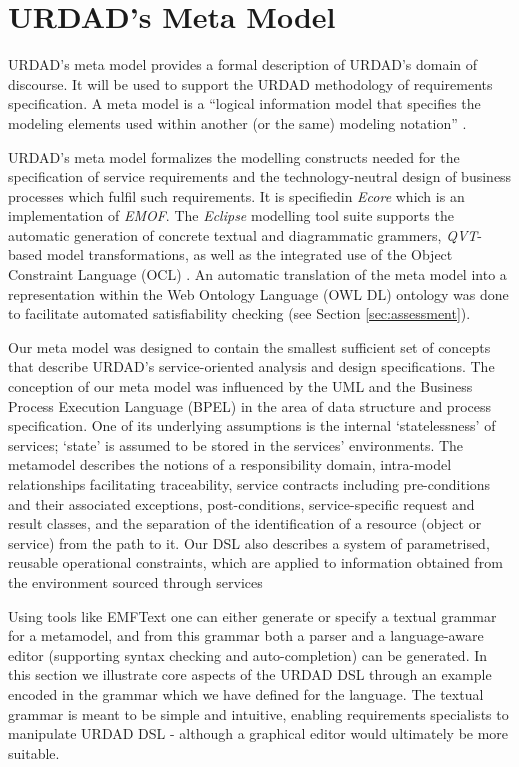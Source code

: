 \section{URDAD's Meta Model \label{sec:metamodel}}

URDAD's meta model provides a formal description of URDAD's domain of discourse. It will be used to support the URDAD methodology of requirements specification. A meta model is a ``logical information model that specifies the modeling elements used within another (or the same) modeling notation'' \cite{_ieee_2003}. 

URDAD's meta model formalizes the modelling constructs needed for the specification of service requirements and the technology-neutral design of business processes which fulfil such requirements. It is specifiedin \emph{Ecore} which is an implementation of \emph{EMOF}. The \emph{Eclipse} modelling tool suite\cite{gronback_model_2008} supports the automatic generation of concrete textual and diagrammatic grammers, \emph{QVT}-based model transformations, as well as the integrated use of the Object Constraint Language (OCL) \cite{_object_2010}. An automatic translation of the meta model into a representation within the Web Ontology Language (OWL DL) ontology was done to facilitate automated satisfiability checking (see Section \ref{sec:assessment}).

Our meta model was designed to contain the smallest sufficient set of concepts that describe URDAD's service-oriented analysis and design specifications.  The conception of our meta model was influenced by the UML and the Business Process Execution Language (BPEL) in the area of data structure and process specification. One of its underlying assumptions is the internal `statelessness' of services; `state' is assumed to be stored in the services' environments. The metamodel describes the notions of a responsibility domain, intra-model relationships facilitating traceability, service contracts including pre-conditions and their associated exceptions, post-conditions, service-specific request and result classes, and the separation of the identification of a resource (object or service) from the path to it. Our DSL also describes a system of parametrised, reusable operational constraints, which are applied to information obtained from the environment sourced through services

Using tools like EMFText \cite{heidenreich_derivation_2009} one can either generate or specify a textual grammar for a metamodel, and from this grammar both a parser and a language-aware editor (supporting syntax checking and auto-completion) can be generated. In this section we illustrate core aspects of the URDAD DSL through an example encoded in the grammar which we have defined for the language. The textual grammar is meant to be simple and intuitive, enabling requirements specialists to manipulate URDAD DSL - although a graphical editor would ultimately be more suitable.

